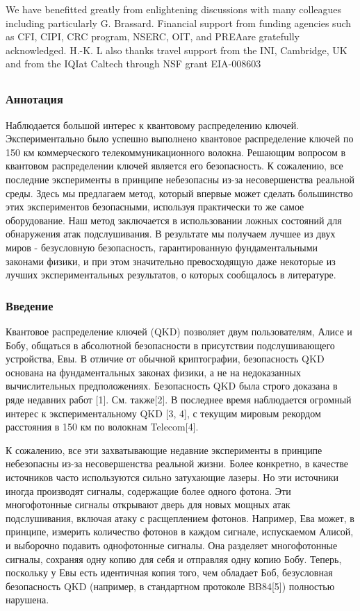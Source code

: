 We have benefitted greatly from enlightening discussions with many colleagues including particularly G. Brassard. Financial support from funding agencies such as CFI, CIPI, CRC program, NSERC, OIT, and PREAare gratefully acknowledged. H.-K. L also thanks travel support from the INI, Cambridge, UK and from the IQIat Caltech through NSF grant EIA-008603

\subsection{\trnas}
\subsubsection*{Аннотация}

Наблюдается большой интерес к квантовому распределению ключей. Экспериментально было успешно выполнено квантовое распределение ключей по 150 км коммерческого телекоммуникационного волокна. Решающим вопросом в квантовом распределении ключей является его безопасность. К сожалению, все последние эксперименты в принципе небезопасны из-за несовершенства реальной среды. Здесь мы предлагаем метод, который впервые может сделать большинство этих экспериментов безопасными, используя практически то же самое оборудование. Наш метод заключается в использовании ложных состояний для обнаружения атак подслушивания. В результате мы получаем лучшее из двух миров - безусловную безопасность, гарантированную фундаментальными законами физики, и при этом значительно превосходящую даже некоторые из лучших экспериментальных результатов, о которых сообщалось в литературе.

\subsubsection{Введение}

Квантовое распределение ключей (QKD) позволяет двум пользователям, Алисе и Бобу, общаться в абсолютной безопасности в присутствии подслушивающего устройства, Евы. В отличие от обычной криптографии, безопасность QKD основана на фундаментальных законах физики, а не на недоказанных вычислительных предположениях. Безопасность QKD была строго доказана в ряде недавних работ [1]. См. также[2]. В последнее время наблюдается огромный интерес к экспериментальному QKD [3, 4], с текущим мировым рекордом расстояния в 150 км по волокнам Telecom[4].

К сожалению, все эти захватывающие недавние эксперименты в принципе небезопасны из-за несовершенства реальной жизни. Более конкретно, в качестве источников часто используются сильно затухающие лазеры. Но эти источники иногда производят сигналы, содержащие более одного фотона. Эти многофотонные сигналы открывают дверь для новых мощных атак подслушивания, включая атаку с расщеплением фотонов. Например, Ева может, в принципе, измерить количество фотонов в каждом сигнале, испускаемом Алисой, и выборочно подавить однофотонные сигналы. Она разделяет многофотонные сигналы, сохраняя одну копию для себя и отправляя одну копию Бобу. Теперь, поскольку у Евы есть идентичная копия того, чем обладает Боб, безусловная безопасность QKD (например, в стандартном протоколе BB84[5]) полностью нарушена.

